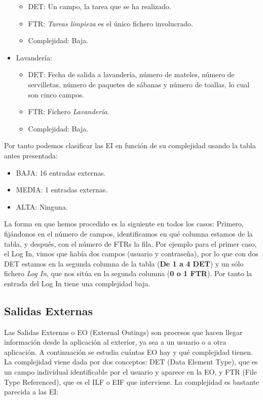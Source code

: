 \documentclass[spanish,a4paper,12pt]{report}	%
\begin{document}
\begin{itemize}
		\begin{itemize}
 			\item{DET:} Un campo, la tarea que se ha realizado.
			\item{FTR:} \textit{Tareas limpieza} es el único fichero involucrado.
			\item{Complejidad:} Baja.
		\end{itemize}
		\item{Lavandería:} 
		\begin{itemize}
 			\item{DET:} Fecha de salida a lavandería, número de mateles, número de servilletas, número de paquetes de sábanas y número de toallas, lo cual son cinco campos.
			\item{FTR:} Fichero \textit{Lavandería}.
			\item{Complejidad:} Baja.
		\end{itemize}		
	\end{itemize}

	Por tanto podemos clasificar las EI en función de su complejidad usando la tabla antes presentada:
	\begin{itemize}
	\item{BAJA:} 16 entradas externas.
	\item{MEDIA:} 1 entradas externas.
	\item{ALTA:} Ninguna.
	\end{itemize}
	
	La forma en que hemos procedido es la siguiente en todos los casos: Primero, fijándonos en el número de campos, identificamos en qué columna estamos de la tabla, y después, con el número de FTRs la fila. Por ejemplo para el primer caso, el Log In, vimos que había dos campos (usuario y contraseña), por lo que con dos DET estamos en la segunda columna de la tabla (\textbf{De 1 a 4 DET}) y un sólo fichero \textit{Log In}, que nos sitúa en la segunda columna (\textbf{0 o 1 FTR}). Por tanto la entrada del Log In tiene una complejidad baja.

	\subsection{Salidas Externas}
	Las Salidas Externas o EO (External Outings) son procesos que hacen llegar información desde la aplicación al exterior, ya sea a un usuario o a otra aplicación.  A continuación se estudia cuántas EO hay y qué complejidad tienen. La complejidad viene dada por dos conceptos: DET (Data Element Type), que es un campo individual identificable por el usuario y aparece en la EO, y FTR (File Type Referenced), que es el ILF o EIF que interviene. La complejidad es bastante parecida a las EI: 
\end{document}
